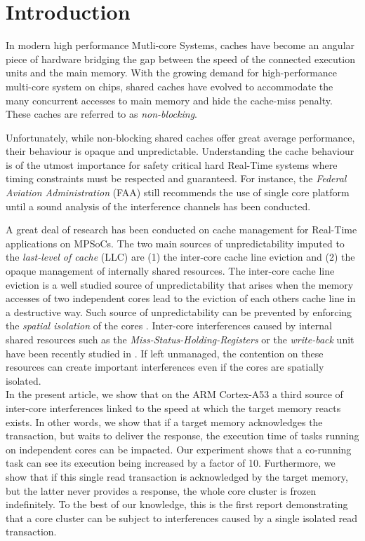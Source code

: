 \section{Introduction}
    In modern high performance Mutli-core Systems, caches have become an angular piece of hardware bridging the gap between the speed of the connected execution units and the main memory.
    With the growing demand for high-performance multi-core system on chips, shared caches have evolved to accommodate the many concurrent accesses to main memory and hide the cache-miss penalty.
    These caches are referred to as \emph{non-blocking}.

    Unfortunately, while non-blocking shared caches offer great average performance, their behaviour is opaque and unpredictable.
    Understanding the cache behaviour is of the utmost importance for safety critical hard Real-Time systems where timing constraints must be respected and guaranteed. For instance, the \emph{Federal Aviation Administration} (FAA) \cite{faa} still recommends the use of single core platform until a sound analysis of the interference channels has been conducted.

    A great deal of research has been conducted on cache management for Real-Time applications on MPSoCs.
    The two main sources of unpredictability imputed to the \emph{last-level of cache} (LLC) are (1) the inter-core cache line eviction and (2) the opaque management of internally shared resources.
    The inter-core cache line eviction is a well studied source of unpredictability that arises when the memory accesses of two independent cores lead to the eviction of each others cache line in a destructive way.
    Such source of unpredictability can be prevented by enforcing the \emph{spatial isolation} of the cores \cite{Mancuso2013RealtimeCM, 6755286}.
    Inter-core interferences caused by internal shared resources such as the \emph{Miss-Status-Holding-Registers} or the \emph{write-back} unit have been recently studied in \cite{Valsan2017AddressingIC, Heechul_DDOS_attacks_on_shared_cache}.
    If left unmanaged, the contention on these resources can create important interferences even if the cores are spatially isolated.\\

    In the present article, we show that on the ARM Cortex-A53 \cite{ARM-cortex-A53} a third source of inter-core interferences linked to the speed at which  the target memory reacts exists.
    In other words, we show that if a target memory acknowledges the transaction, but waits to deliver the response, the execution time of tasks running on independent cores can be impacted.
    Our experiment shows that a co-running task can see its execution being increased by a factor of 10.
    Furthermore, we show that if this single read transaction is acknowledged by the target memory, but the latter never provides a response, the whole core cluster is frozen indefinitely.
    To the best of our knowledge, this is the first report demonstrating that a core cluster can be subject to interferences caused by a single isolated read transaction.
